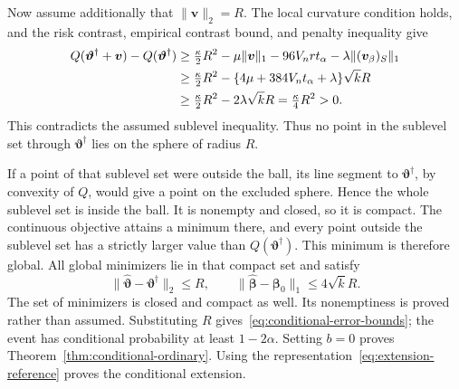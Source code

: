 Now assume additionally that $\|\bm{v}\|_2=R$. The local curvature condition holds, and the risk contrast, empirical contrast bound, and penalty inequality give
\begin{align}
 Q(\bm{\vartheta}^\dagger+\bm{v})-Q(\bm{\vartheta}^\dagger)
 &\ge\tfrac\kappa2R^2-\mu\|\bm{v}\|_1-96V_nrt_\alpha
                         -\lambda\|(\bm{v}_\beta)_S\|_1\notag\\
 &\ge\tfrac\kappa2R^2
             -\{4\mu+384V_nt_\alpha+\lambda\}\sqrt{k}R\notag\\
 &\ge\tfrac\kappa2R^2-2\lambda\sqrt{k}R
   =\tfrac\kappa4R^2>0.
 \label{eq:C-sphere-separation}
\end{align}
This contradicts the assumed sublevel inequality. Thus no point in the sublevel set through $\bm{\vartheta}^\dagger$ lies on the sphere of radius $R$.

If a point of that sublevel set were outside the ball, its line segment to $\bm{\vartheta}^\dagger$, by convexity of $Q$, would give a point on the excluded sphere. Hence the whole sublevel set is inside the ball. It is nonempty and closed, so it is compact. The continuous objective attains a minimum there, and every point outside the sublevel set has a strictly larger value than $Q(\bm{\vartheta}^\dagger)$. This minimum is therefore global. All global minimizers lie in that compact set and satisfy
\[
 \|\widehat{\bm{\vartheta}}-\bm{\vartheta}^\dagger\|_2\le R,\qquad
 \|\widehat{\bm{\beta}}-\bm{\beta}_0\|_1\le4\sqrt{k}R.
\]
The set of minimizers is closed and compact as well. Its nonemptiness is proved rather than assumed. Substituting $R$ gives~\eqref{eq:conditional-error-bounds}; the event has conditional probability at least $1-2\alpha$. Setting $b=0$ proves Theorem~\ref{thm:conditional-ordinary}. Using the representation~\eqref{eq:extension-reference} proves the conditional extension.
